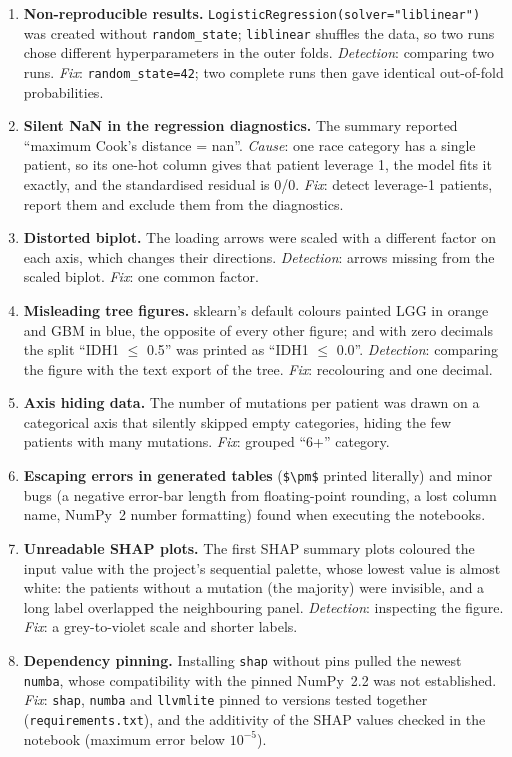 \begin{enumerate}
  \item \textbf{Non-reproducible results.} \texttt{LogisticRegression(solver="liblinear")} was created
        without \texttt{random\_state}; \texttt{liblinear} shuffles the data, so two runs chose different
        hyperparameters in the outer folds. \emph{Detection}: comparing two runs. \emph{Fix}:
        \texttt{random\_state=42}; two complete runs then gave identical out-of-fold probabilities.
  \item \textbf{Silent NaN in the regression diagnostics.} The summary reported ``maximum Cook's
        distance = nan''. \emph{Cause}: one race category has a single patient, so its one-hot column
        gives that patient leverage 1, the model fits it exactly, and the standardised residual is 0/0.
        \emph{Fix}: detect leverage-1 patients, report them and exclude them from the diagnostics.
  \item \textbf{Distorted biplot.} The loading arrows were scaled with a different factor on each axis,
        which changes their directions. \emph{Detection}: arrows missing from the scaled biplot.
        \emph{Fix}: one common factor.
  \item \textbf{Misleading tree figures.} sklearn's default colours painted LGG in orange and GBM in
        blue, the opposite of every other figure; and with zero decimals the split ``IDH1 $\leq$ 0.5''
        was printed as ``IDH1 $\leq$ 0.0''. \emph{Detection}: comparing the figure with the text export of
        the tree. \emph{Fix}: recolouring and one decimal.
  \item \textbf{Axis hiding data.} The number of mutations per patient was drawn on a categorical axis
        that silently skipped empty categories, hiding the few patients with many mutations.
        \emph{Fix}: grouped ``6+'' category.
  \item \textbf{Escaping errors in generated tables} (\texttt{\$\textbackslash pm\$} printed literally)
        and minor bugs (a negative error-bar length from floating-point rounding, a lost column name,
        NumPy~2 number formatting) found when executing the notebooks.
  \item \textbf{Unreadable SHAP plots.} The first SHAP summary plots coloured the input value with the
        project's sequential palette, whose lowest value is almost white: the patients without a
        mutation (the majority) were invisible, and a long label overlapped the neighbouring panel.
        \emph{Detection}: inspecting the figure. \emph{Fix}: a grey-to-violet scale and shorter labels.
  \item \textbf{Dependency pinning.} Installing \texttt{shap} without pins pulled the newest
        \texttt{numba}, whose compatibility with the pinned NumPy~2.2 was not established.
        \emph{Fix}: \texttt{shap}, \texttt{numba} and \texttt{llvmlite} pinned to versions tested together
        (\texttt{requirements.\allowbreak{}txt}), and the additivity of the SHAP values checked in the notebook
        (maximum error below $10^{-5}$).
\end{enumerate}

